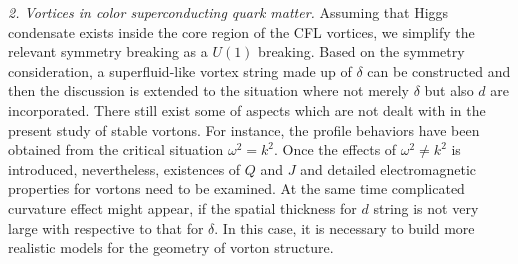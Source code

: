 \documentclass[12pt]{article}
\begin{document}
%

\emph{2. Vortices in color superconducting quark matter.} Assuming that Higgs condensate exists inside the core region of the CFL vortices, we simplify the relevant symmetry breaking as a $U(1)$ breaking. Based on the symmetry consideration, a superfluid-like
vortex string made up of $\delta$ can be constructed and then the discussion is extended to the situation where not merely $\delta$ but also $d$ are incorporated. 
There still exist some of aspects which are not dealt with in the present study of stable vortons. 
For instance, the profile behaviors have been obtained from the critical situation $\omega^2 = k^2$.
Once the effects of $\omega^2 \neq k^2$ is introduced, nevertheless, existences of $Q$ and $J$ and detailed electromagnetic properties for vortons need to be examined. 
At the same time complicated curvature effect might appear, if the spatial thickness for $d$ string is not very large with respective to that for $\delta$. In this case, it is necessary to build more realistic models for the geometry of vorton structure. 
\end{document}
